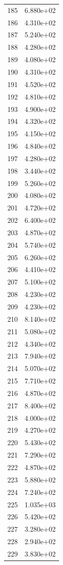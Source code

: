 \documentclass[12pt]{article}
\begin{document}
\begin{longtable}{@{}cc@{}}
185 & 6.880e+02 \\
186 & 4.310e+02 \\
187 & 5.240e+02 \\
188 & 4.280e+02 \\
189 & 4.080e+02 \\
190 & 4.310e+02 \\
191 & 4.520e+02 \\
192 & 4.810e+02 \\
193 & 4.900e+02 \\
194 & 4.320e+02 \\
195 & 4.150e+02 \\
196 & 4.840e+02 \\
197 & 4.280e+02 \\
198 & 3.440e+02 \\
199 & 5.260e+02 \\
200 & 4.080e+02 \\
201 & 4.720e+02 \\
202 & 6.400e+02 \\
203 & 4.870e+02 \\
204 & 5.740e+02 \\
205 & 6.260e+02 \\
206 & 4.410e+02 \\
207 & 5.100e+02 \\
208 & 4.230e+02 \\
209 & 4.230e+02 \\
210 & 8.140e+02 \\
211 & 5.080e+02 \\
212 & 4.340e+02 \\
213 & 7.940e+02 \\
214 & 5.070e+02 \\
215 & 7.710e+02 \\
216 & 4.870e+02 \\
217 & 8.400e+02 \\
218 & 4.000e+02 \\
219 & 4.270e+02 \\
220 & 5.430e+02 \\
221 & 7.290e+02 \\
222 & 4.870e+02 \\
223 & 5.880e+02 \\
224 & 7.240e+02 \\
225 & 1.035e+03 \\
226 & 5.420e+02 \\
227 & 3.280e+02 \\
228 & 2.940e+02 \\
229 & 3.830e+02 \\

\end{longtable}
\end{document}
